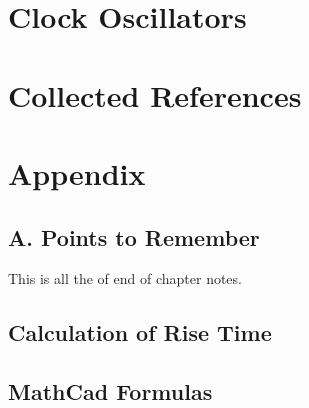 \documentclass{article}
\begin{document}
	\section{Clock Oscillators}
	
	\section{Collected References}
	
	\section{Appendix}
	\subsection{A. Points to Remember}
	This is all the of end of chapter notes.
	\subsection{Calculation of Rise Time}
	
	\subsection{MathCad Formulas}
	
	
\end{document}
